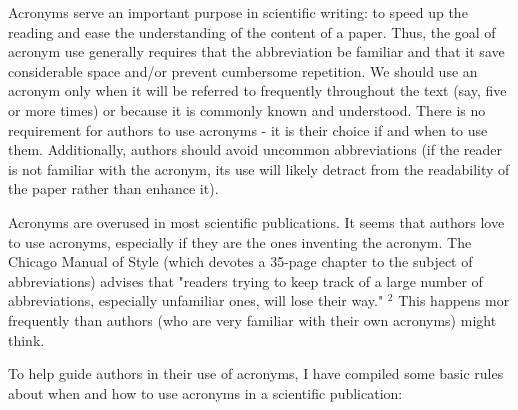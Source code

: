Acronyms serve an important purpose in scientific writing: to speed up the reading and ease the understanding of the content of a paper. Thus, the goal of acronym use generally requires that the abbreviation be familiar and that it save considerable space and/or prevent cumbersome repetition. We should use an acronym only when it will be referred to frequently throughout the text (say, five or more times) or because it is commonly known and understood. There is no requirement for authors to use acronyms - it is their choice if and when to use them. Additionally, authors should avoid uncommon abbreviations (if the reader is not familiar with the acronym, its use will likely detract from the readability of the paper rather than enhance it).

Acronyms are overused in most scientific publications. It seems that authors love to use acronyms, especially if they are the ones inventing the acronym. The Chicago Manual of Style (which devotes a 35-page chapter to the subject of abbreviations) advises that "readers trying to keep track of a large number of abbreviations, especially unfamiliar ones, will lose their way." ${ }^{2}$ This happens mor frequently than authors (who are very familiar with their own acronyms) might think.

To help guide authors in their use of acronyms, I have compiled some basic rules about when and how to use acronyms in a scientific publication:

